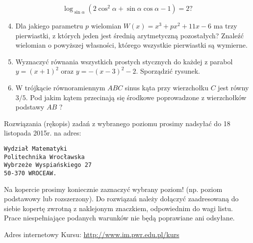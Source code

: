 \documentclass[10pt]{article}
\begin{document}
$$
\log _{\sin \alpha}\left(2 \cos ^{2} \alpha+\sin \alpha \cos \alpha-1\right)=2 ?
$$

\begin{enumerate}
  \setcounter{enumi}{3}
  \item Dla jakiego parametru $p$ wielomian $W(x)=x^{3}+p x^{2}+11 x-6$ ma trzy pierwiastki, z których jeden jest średnią arytmetyczną pozostałych? Znaleźć wielomian o powyższej własności, którego wszystkie pierwiastki są wymierne.
  \item Wyznaczyć równania wszystkich prostych stycznych do każdej z parabol $y=(x+1)^{2}$ oraz $y=-(x-3)^{2}-2$. Sporządzić rysunek.
  \item W trójkącie równoramiennym $A B C$ sinus kąta przy wierzchołku $C$ jest równy $3 / 5$. Pod jakim kątem przecinają się środkowe poprowadzone z wierzchołków podstawy $A B$ ?
\end{enumerate}

Rozwiązania (rękopis) zadań z wybranego poziomu prosimy nadsyłać do 18 listopada 2015r. na adres:

\begin{verbatim}
Wydział Matematyki
Politechnika Wrocławska
Wybrzeże Wyspiańskiego 27
50-370 WROCEAW.
\end{verbatim}

Na kopercie prosimy koniecznie zaznaczyć wybrany poziom! (np. poziom podstawowy lub rozszerzony). Do rozwiązań należy dołączyć zaadresowaną do siebie kopertę zwrotną z naklejonym znaczkiem, odpowiednim do wagi listu. Prace niespełniające podanych warunków nie będą poprawiane ani odsyłane.

Adres internetowy Kursu: \href{http://www.im.pwr.edu.pl/kurs}{http://www.im.pwr.edu.pl/kurs}
\end{document}
